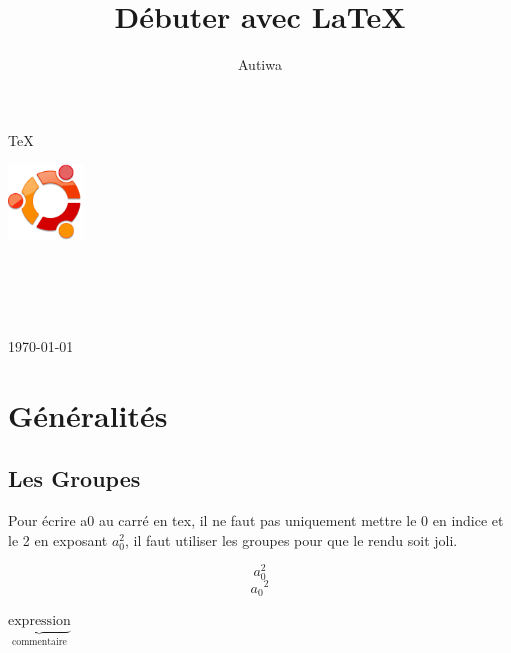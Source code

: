 \documentclass[a4paper,twoside]{article}
\title{Débuter avec \LaTeX}
\author{Autiwa}
\begin{document}
\begin{titlepage}

\begin{center}

\vfill
\begin{Huge}\TeX\end{Huge}\hfill\includegraphics[width=0.15\textwidth]{figure/logo-ubuntu.pdf}\hfill\begin{Huge}\LaTeXe\end{Huge}\\[1cm]

\HRule \\[0.4cm]
{ \huge \bfseries \makeatletter\@title\makeatother}\\[0.4cm]

\HRule \\[0.75cm]
{\large \today}\\[0.75cm]
\makeatletter
\@author
\makeatother
\vfill
{}
\vfill



\end{center}

\end{titlepage}
\tableofcontents
\newpage


\section{Généralités}
\subsection{Les Groupes}
Pour écrire a0 au carré en tex, il ne faut pas uniquement mettre le 0 en indice et le 2 en exposant \(a_0^2\), il faut utiliser les groupes pour que le rendu soit joli.

\begin{example}
\[a_0^2\]
\[{a_0}^2\]
\end{example}

\begin{example}
\(\underbrace{\text{expression}}
_\text{commentaire}\)
\end{example}
\end{document}
